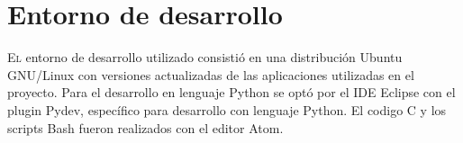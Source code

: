 
\chapter{Entorno de desarrollo}
\label{chap:entorno-desarrollo}

\lettrine{E}{l} entorno de desarrollo utilizado consistió en una distribución Ubuntu GNU/Linux con versiones actualizadas de las aplicaciones utilizadas en el proyecto. Para el desarrollo en lenguaje Python se optó por el IDE Eclipse con el plugin Pydev, específico para desarrollo con lenguaje Python. El codigo C y los scripts Bash fueron realizados con el editor Atom.
